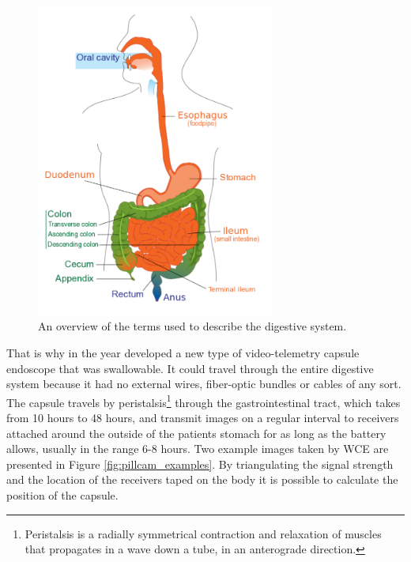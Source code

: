 \documentclass[english, a4paper]{report}
\begin{document}
\begin{figure} %
  \begin{center}
    \includegraphics[width=0.7\textwidth]{digestive-system}
    \caption{An overview of the terms used to describe the digestive system. \cite{DigestiveSystem} }
    \label{fig:digestive_system}
  \end{center}
\end{figure}

That is why in the year \citeyear{WirelessCapsule00} \citeauthor*{WirelessCapsule00} \cite{WirelessCapsule00} developed a new type of video-telemetry capsule endoscope that was swallowable. It could travel through the entire digestive system because it had no external wires, fiber-optic bundles or cables of any sort. The capsule travels by peristalsis\footnote{Peristalsis is a radially symmetrical contraction and relaxation of muscles that propagates in a wave down a tube, in an anterograde direction.} through the gastrointestinal tract, which takes from 10 hours to 48 hours, and transmit images on a regular interval to receivers attached around the outside of the patients stomach for as long as the battery allows, usually in the range 6-8 hours. Two example images taken by WCE are presented in Figure \ref{fig:pillcam_examples}. By triangulating the signal strength and the location of the receivers taped on the body it is possible to calculate the position of the capsule.
\end{document}
